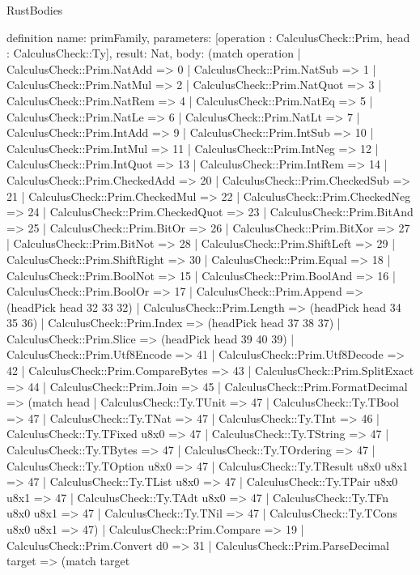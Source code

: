 \begin{lexlean}{RustBodies}
\begin{semanticmodule}
definition{
  name: primFamily,
  parameters: [operation : CalculusCheck::Prim, head : CalculusCheck::Ty],
  result: Nat,
  body: (match operation
    | CalculusCheck::Prim.NatAdd => 0
    | CalculusCheck::Prim.NatSub => 1
    | CalculusCheck::Prim.NatMul => 2
    | CalculusCheck::Prim.NatQuot => 3
    | CalculusCheck::Prim.NatRem => 4
    | CalculusCheck::Prim.NatEq => 5
    | CalculusCheck::Prim.NatLe => 6
    | CalculusCheck::Prim.NatLt => 7
    | CalculusCheck::Prim.IntAdd => 9
    | CalculusCheck::Prim.IntSub => 10
    | CalculusCheck::Prim.IntMul => 11
    | CalculusCheck::Prim.IntNeg => 12
    | CalculusCheck::Prim.IntQuot => 13
    | CalculusCheck::Prim.IntRem => 14
    | CalculusCheck::Prim.CheckedAdd => 20
    | CalculusCheck::Prim.CheckedSub => 21
    | CalculusCheck::Prim.CheckedMul => 22
    | CalculusCheck::Prim.CheckedNeg => 24
    | CalculusCheck::Prim.CheckedQuot => 23
    | CalculusCheck::Prim.BitAnd => 25
    | CalculusCheck::Prim.BitOr => 26
    | CalculusCheck::Prim.BitXor => 27
    | CalculusCheck::Prim.BitNot => 28
    | CalculusCheck::Prim.ShiftLeft => 29
    | CalculusCheck::Prim.ShiftRight => 30
    | CalculusCheck::Prim.Equal => 18
    | CalculusCheck::Prim.BoolNot => 15
    | CalculusCheck::Prim.BoolAnd => 16
    | CalculusCheck::Prim.BoolOr => 17
    | CalculusCheck::Prim.Append => (headPick head 32 33 32)
    | CalculusCheck::Prim.Length => (headPick head 34 35 36)
    | CalculusCheck::Prim.Index => (headPick head 37 38 37)
    | CalculusCheck::Prim.Slice => (headPick head 39 40 39)
    | CalculusCheck::Prim.Utf8Encode => 41
    | CalculusCheck::Prim.Utf8Decode => 42
    | CalculusCheck::Prim.CompareBytes => 43
    | CalculusCheck::Prim.SplitExact => 44
    | CalculusCheck::Prim.Join => 45
    | CalculusCheck::Prim.FormatDecimal => (match head
      | CalculusCheck::Ty.TUnit => 47
      | CalculusCheck::Ty.TBool => 47
      | CalculusCheck::Ty.TNat => 47
      | CalculusCheck::Ty.TInt => 46
      | CalculusCheck::Ty.TFixed u8x0 => 47
      | CalculusCheck::Ty.TString => 47
      | CalculusCheck::Ty.TBytes => 47
      | CalculusCheck::Ty.TOrdering => 47
      | CalculusCheck::Ty.TOption u8x0 => 47
      | CalculusCheck::Ty.TResult u8x0 u8x1 => 47
      | CalculusCheck::Ty.TList u8x0 => 47
      | CalculusCheck::Ty.TPair u8x0 u8x1 => 47
      | CalculusCheck::Ty.TAdt u8x0 => 47
      | CalculusCheck::Ty.TFn u8x0 u8x1 => 47
      | CalculusCheck::Ty.TNil => 47
      | CalculusCheck::Ty.TCons u8x0 u8x1 => 47)
    | CalculusCheck::Prim.Compare => 19
    | CalculusCheck::Prim.Convert d0 => 31
    | CalculusCheck::Prim.ParseDecimal target => (match target
}
\end{semanticmodule}
\end{lexlean}
